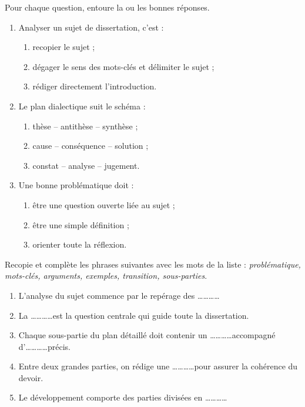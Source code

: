 \documentclass[11pt]{article}
\begin{document}
\begin{exercice}[QCM]
Pour chaque question, entoure la ou les bonnes réponses.
\begin{enumerate}
\item Analyser un sujet de dissertation, c'est :
\begin{enumerate}
\item recopier le sujet ;
\item dégager le sens des mots-clés et délimiter le sujet ;
\item rédiger directement l'introduction.
\end{enumerate}
\item Le plan dialectique suit le schéma :
\begin{enumerate}
\item thèse -- antithèse -- synthèse ;
\item cause -- conséquence -- solution ;
\item constat -- analyse -- jugement.
\end{enumerate}
\item Une bonne problématique doit :
\begin{enumerate}
\item être une question ouverte liée au sujet ;
\item être une simple définition ;
\item orienter toute la réflexion.
\end{enumerate}
\end{enumerate}
\end{exercice}

\begin{exercice}[Complétion]
Recopie et complète les phrases suivantes avec les mots de la liste : \textit{problématique, mots-clés, arguments, exemples, transition, sous-parties}.
\begin{enumerate}
\item L'analyse du sujet commence par le repérage des \ldots\ldots\ldots\ldots
\item La \ldots\ldots\ldots\ldots est la question centrale qui guide toute la dissertation.
\item Chaque sous-partie du plan détaillé doit contenir un \ldots\ldots\ldots\ldots accompagné d'\ldots\ldots\ldots\ldots précis.
\item Entre deux grandes parties, on rédige une \ldots\ldots\ldots\ldots pour assurer la cohérence du devoir.
\item Le développement comporte des parties divisées en \ldots\ldots\ldots\ldots
\end{enumerate}
\end{exercice}
\end{document}
